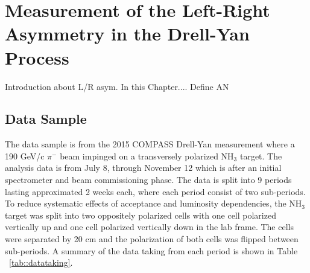 \chapter{Measurement of the Left-Right Asymmetry in the Drell-Yan Process} 
\label{Chap::leftright}
\ifpdf
\graphicspath{{Chapters/LeftRight/Figs/Raster/}{Chapters/LeftRight/Figs/PDF/}{Chapters/LeftRight/Figs/}}
\else \graphicspath{{Chapters/LeftRight/Figs/Vector/}{Chapters/LeftRight/Figs/}} \fi

Introduction about L/R asym.  In this Chapter....  Define AN


\section{Data Sample} \label{sec::datasample}
The data sample is from the 2015 COMPASS Drell-Yan measurement where a 190 GeV/c
$\pi^-$ beam impinged on a transversely polarized NH$_3$ target.  The analysis
data is from July 8, through November 12 which is after an initial spectrometer
and beam commissioning phase.  The data is split into 9 periods lasting
approximated 2 weeks each, where each period consist of two sub-periods.  To
reduce systematic effects of acceptance and luminosity dependencies, the NH$_3$
target was split into two oppositely polarized cells with one cell polarized
vertically up and one cell polarized vertically down in the lab frame.  The
cells were separated by 20 cm and the polarization of both cells was flipped
between sub-periods.  A summary of the data taking from each period is shown in
Table ~\ref{tab::datataking}.

